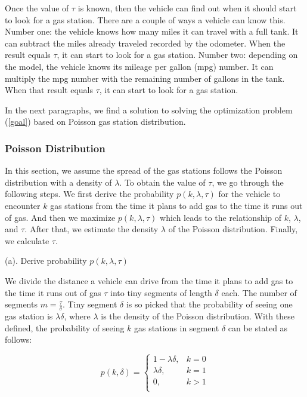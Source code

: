 \documentclass[conference]{IEEEtran}
\theoremstyle{definition}
\begin{document}
Once the value of $\tau$ is known, then the vehicle can find out when it should start to look for a gas station. There are a couple of ways a vehicle can know this. Number one: the vehicle knows how many miles it can travel with a full tank. It can subtract the miles already traveled recorded by the odometer. When the result equals $\tau$, it can start to look for a gas station. Number two: depending on the model, the vehicle knows its mileage per gallon (mpg) number. It can multiply the mpg number with the remaining number of gallons in the tank. When that result equals $\tau$, it can start to look for a gas station.

In the next paragraphs, we find a solution to solving the optimization problem (\ref{goal}) based on Poisson gas station distribution.

\subsubsection{Poisson Distribution}
In this section, we assume the spread of the gas stations follows the Poisson distribution with a density of $\lambda$. To obtain the value of $\tau$, we go through the following steps. We first derive the probability $p(k, \lambda, \tau)$ for the vehicle to encounter $k$ gas stations from the time it plans to add gas to the time it runs out of gas. And then we maximize $p(k, \lambda, \tau)$ which leads to the relationship of $k$, $\lambda$, and $\tau$. After that, we estimate the density $\lambda$ of the Poisson distribution. Finally, we  calculate $\tau$.

\noindent (a). Derive probability $p(k, \lambda, \tau)$

 We divide the distance a vehicle can drive from the time it plans to add gas to the time it runs out of gas $\tau$ into tiny segments of length $\delta$ each. The number of segments $m=\frac{\tau}{\delta}$. Tiny segment $\delta$ is so picked that the probability of seeing one gas station is $\lambda \delta$, where $\lambda$ is the density of the Poisson distribution. With these defined, the probability of seeing $k$ gas stations in segment $\delta$ can be stated as follows:

\[
p(k, \delta) =
\begin{cases}
1-\lambda \delta, & \text{$k = 0$}\\
\lambda \delta, &\text{$k = 1$}\\
0, &\text{$k > 1$}\\
\end{cases}
\]
\end{document}
